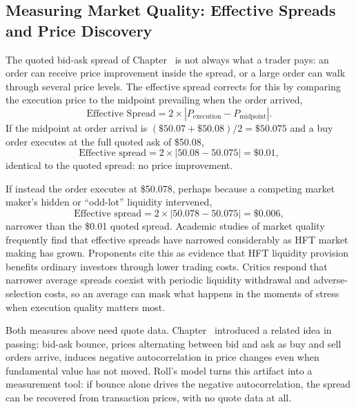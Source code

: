 \documentclass[../ai_in_finance]{subfiles}
\begin{document}
\subsection{Measuring Market Quality: Effective Spreads and Price Discovery}
\label{sec:market-quality}

The quoted bid-ask spread of Chapter~ is not always what a trader pays: an order can receive price improvement inside the spread, or a large order can walk through several price levels. The effective spread corrects for this by comparing the execution price to the midpoint prevailing when the order arrived,
\begin{equation}
\text{Effective Spread} = 2 \times |P_{\text{execution}} - P_{\text{midpoint}}|.
\label{eq:hft-effective-spread}
\end{equation}
If the midpoint at order arrival is $(\$50.07+\$50.08)/2=\$50.075$ and a buy order executes at the full quoted ask of \$50.08,
\begin{equation*}
\text{Effective spread} = 2\times|50.08-50.075| = \$0.01,
\end{equation*}
identical to the quoted spread: no price improvement.

If instead the order executes at \$50.078, perhaps because a competing market maker's hidden or ``odd-lot'' liquidity intervened,
\begin{equation*}
\text{Effective spread} = 2\times|50.078-50.075| = \$0.006,
\end{equation*}
narrower than the \$0.01 quoted spread. Academic studies of market quality frequently find that effective spreads have narrowed considerably as HFT market making has grown. Proponents cite this as evidence that HFT liquidity provision benefits ordinary investors through lower trading costs. Critics respond that narrower average spreads coexist with periodic liquidity withdrawal and adverse-selection costs, so an average can mask what happens in the moments of stress when execution quality matters most.

\label{sec:roll-spread}

Both measures above need quote data. Chapter~ introduced a related idea in passing: bid-ask bounce, prices alternating between bid and ask as buy and sell orders arrive, induces negative autocorrelation in price changes even when fundamental value has not moved. Roll's model \parencite{roll1984simple} turns this artifact into a measurement tool: if bounce alone drives the negative autocorrelation, the spread can be recovered from transaction prices, with no quote data at all.
\end{document}
